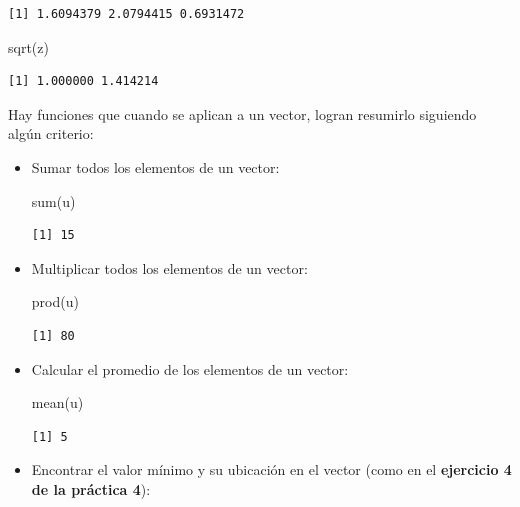 \documentclass[
]{book}
\newenvironment{Shaded}{\begin{snugshade}}{\end{snugshade}}
\newcommand{\FunctionTok}[1]{\textcolor[rgb]{0.00,0.00,0.00}{#1}}
\newcommand{\NormalTok}[1]{#1}
\begin{document}
\begin{verbatim}
[1] 1.6094379 2.0794415 0.6931472
\end{verbatim}

\begin{Shaded}
\begin{Highlighting}[]
\FunctionTok{sqrt}\NormalTok{(z)}
\end{Highlighting}
\end{Shaded}

\begin{verbatim}
[1] 1.000000 1.414214
\end{verbatim}

Hay funciones que cuando se aplican a un vector, logran resumirlo siguiendo algún criterio:

\begin{itemize}
\item
  Sumar todos los elementos de un vector:

\begin{Shaded}
\begin{Highlighting}[]
\FunctionTok{sum}\NormalTok{(u)}
\end{Highlighting}
\end{Shaded}

\begin{verbatim}
[1] 15
\end{verbatim}
\item
  Multiplicar todos los elementos de un vector:

\begin{Shaded}
\begin{Highlighting}[]
\FunctionTok{prod}\NormalTok{(u)}
\end{Highlighting}
\end{Shaded}

\begin{verbatim}
[1] 80
\end{verbatim}
\item
  Calcular el promedio de los elementos de un vector:

\begin{Shaded}
\begin{Highlighting}[]
\FunctionTok{mean}\NormalTok{(u)}
\end{Highlighting}
\end{Shaded}

\begin{verbatim}
[1] 5
\end{verbatim}
\item
  Encontrar el valor mínimo y su ubicación en el vector (como en el \textbf{ejercicio 4 de la práctica 4}):


\end{itemize}
\end{document}
